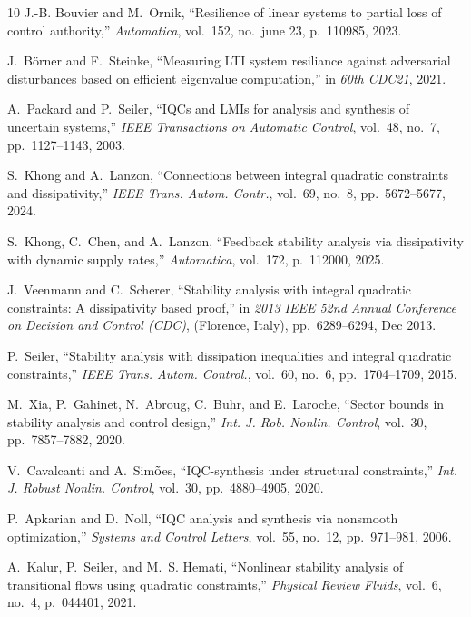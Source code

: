 \documentclass[12pt, a4paper,reqno]{amsart}
\theoremstyle{definition}
\begin{document}
\begin{thebibliography}{10}
J.-B. Bouvier and M.~Ornik, ``Resilience of linear systems to partial loss of
  control authority,'' {\em Automatica}, vol.~152, no.~june 23, p.~110985,
  2023.

J.~B\"orner and F.~Steinke, ``Measuring {LTI} system resiliance against
  adversarial disturbances based on efficient eigenvalue computation,'' in {\em
  60th CDC21}, 2021.

A.~Packard and P.~Seiler, ``{IQC}s and {LMI}s for analysis and synthesis of
  uncertain systems,'' {\em IEEE Transactions on Automatic Control}, vol.~48,
  no.~7, pp.~1127--1143, 2003.

S.~Khong and A.~Lanzon, ``Connections between integral quadratic constraints
  and dissipativity,'' {\em IEEE Trans. Autom. Contr.}, vol.~69, no.~8,
  pp.~5672--5677, 2024.

S.~Khong, C.~Chen, and A.~Lanzon, ``Feedback stability analysis via
  dissipativity with dynamic supply rates,'' {\em Automatica}, vol.~172,
  p.~112000, 2025.

J.~Veenmann and C.~Scherer, ``Stability analysis with integral quadratic
  constraints: A dissipativity based proof,'' in {\em 2013 IEEE 52nd Annual
  Conference on Decision and Control (CDC)}, (Florence, Italy), pp.~6289--6294,
  Dec 2013.

P.~Seiler, ``Stability analysis with dissipation inequalities and integral
  quadratic constraints,'' {\em IEEE Trans. Autom. Control.}, vol.~60, no.~6,
  pp.~1704--1709, 2015.

M.~Xia, P.~Gahinet, N.~Abroug, C.~Buhr, and E.~Laroche, ``Sector bounds in
  stability analysis and control design,'' {\em Int. J. Rob. Nonlin. Control},
  vol.~30, pp.~7857--7882, 2020.

V.~Cavalcanti and A.~Sim$\tilde{\rm o}$es, ``{IQC}-synthesis under structural
  constraints,'' {\em Int. J. Robust Nonlin. Control}, vol.~30, pp.~4880--4905,
  2020.

P.~Apkarian and D.~Noll, ``{IQC} analysis and synthesis via nonsmooth
  optimization,'' {\em Systems and Control Letters}, vol.~55, no.~12,
  pp.~971--981, 2006.

A.~Kalur, P.~Seiler, and M.~S. Hemati, ``Nonlinear stability analysis of
  transitional flows using quadratic constraints,'' {\em Physical Review
  Fluids}, vol.~6, no.~4, p.~044401, 2021.


\end{thebibliography}
\end{document}
